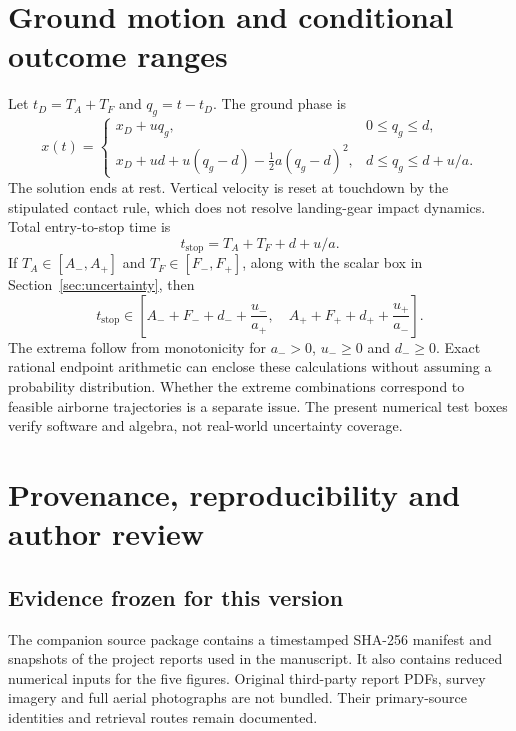 \section{Ground motion and conditional outcome ranges}
\label{app:ground}
Let $t_D=T_A+T_F$ and $q_g=t-t_D$. The ground phase is
\begin{equation}
x(t)=\begin{cases}
x_D+uq_g,&0\leq q_g\leq d,\\
x_D+ud+u(q_g-d)-\tfrac12 a(q_g-d)^2,&d\leq q_g\leq d+u/a.
\end{cases}
\end{equation}
The solution ends at rest. Vertical velocity is reset at touchdown by the stipulated contact rule, which does not resolve landing-gear impact dynamics. Total entry-to-stop time is
\begin{equation}
t_{\mathrm{stop}}=T_A+T_F+d+u/a.
\end{equation}
If $T_A\in[A_-,A_+]$ and $T_F\in[F_-,F_+]$, along with the scalar box in Section~\ref{sec:uncertainty}, then
\begin{equation}
t_{\mathrm{stop}}\in
\left[A_-+F_-+d_-+\frac{u_-}{a_+},\quad
A_++F_++d_++\frac{u_+}{a_-}\right].
\end{equation}
The extrema follow from monotonicity for $a_->0$, $u_-\geq0$ and $d_-\geq0$. Exact rational endpoint arithmetic can enclose these calculations without assuming a probability distribution. Whether the extreme combinations correspond to feasible airborne trajectories is a separate issue. The present numerical test boxes verify software and algebra, not real-world uncertainty coverage.

\section{Provenance, reproducibility and author review}
\label{app:provenance}
\subsection{Evidence frozen for this version}
The companion source package contains a timestamped SHA-256 manifest and snapshots of the project reports used in the manuscript. It also contains reduced numerical inputs for the five figures. Original third-party report PDFs, survey imagery and full aerial photographs are not bundled. Their primary-source identities and retrieval routes remain documented.

